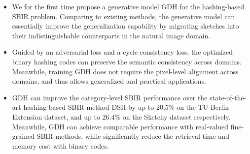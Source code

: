 \documentclass[runningheads]{llncs}
\begin{document}
\begin{itemize}
  \item 
  \vspace{-0.589em}
    We for the first time propose a generative model GDH for the hashing-based SBIR problem. Comparing to existing methods, the generative model can essentially improve the generalization capability by migrating sketches into their indistinguishable counterparts in the natural image domain.
  \item Guided by an adversarial loss and a cycle consistency loss, the optimized binary hashing codes can preserve the semantic consistency across domains. Meanwhile, training GDH does not require the pixel-level alignment across domains, and thus allows generalized and practical applications.
  \item 
  GDH can improve the category-level SBIR performance over the state-of-the-art hashing-based SBIR method DSH \cite{LiuSSLS17} by up to $20.5\%$ on the TU-Berlin Extension dataset, and up to $26.4\%$ on the Sketchy dataset respectively. Meanwhile, GDH can achieve comparable performance with real-valued fine-grained SBIR methods, while significantly reduce the retrieval time and memory cost with binary codes. 
  
 \end{itemize}
\end{document}
